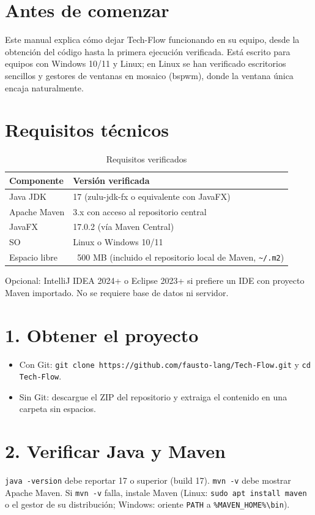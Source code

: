 \documentclass[12pt,a4paper]{report}
\begin{document}
\tableofcontents\clearpage

\section{Antes de comenzar}
Este manual explica cómo dejar Tech-Flow funcionando en su equipo, desde la obtención del código hasta la primera ejecución verificada. Está escrito para equipos con Windows 10/11 y Linux; en Linux se han verificado escritorios sencillos y gestores de ventanas en mosaico (bspwm), donde la ventana única encaja naturalmente.

\section{Requisitos técnicos}
\begin{table}[H]\centering\caption{Requisitos verificados}\begin{tabular}{ll}\toprule
Componente & Versión verificada\\\midrule
Java JDK & 17 (zulu-jdk-fx o equivalente con JavaFX)\\
Apache Maven & 3.x con acceso al repositorio central\\
JavaFX & 17.0.2 (vía Maven Central)\\
SO & Linux o Windows 10/11\\
Espacio libre & ~500 MB (incluido el repositorio local de Maven, \texttt{\textasciitilde/.m2})\\\bottomrule\end{tabular}\end{table}

Opcional: IntelliJ IDEA 2024+ o Eclipse 2023+ si prefiere un IDE con proyecto Maven importado. No se requiere base de datos ni servidor.

\section{1. Obtener el proyecto}
\begin{itemize}
\item Con Git: \texttt{git clone https://github.com/fausto-lang/Tech-Flow.git} y \texttt{cd Tech-Flow}.
\item Sin Git: descargue el ZIP del repositorio y extraiga el contenido en una carpeta sin espacios.
\end{itemize}

\section{2. Verificar Java y Maven}
\texttt{java -version} debe reportar 17 o superior (build 17). \texttt{mvn -v} debe mostrar Apache Maven. Si \texttt{mvn -v} falla, instale Maven (Linux: \texttt{sudo apt install maven} o el gestor de su distribución; Windows: oriente \texttt{PATH} a \texttt{\%MAVEN\_HOME\%\textbackslash bin}).
\end{document}
